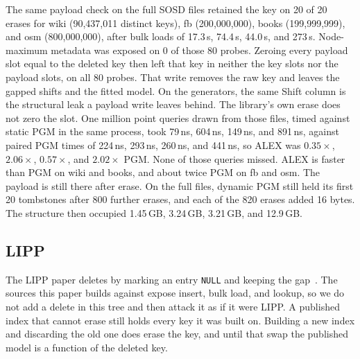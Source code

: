 \documentclass[conference]{IEEEtran}
\begin{document}
The same payload check on the full SOSD files retained the key on 20 of 20 erases for wiki (90{,}437{,}011 distinct keys), fb (200{,}000{,}000), books (199{,}999{,}999), and osm (800{,}000{,}000), after bulk loads of 17.3\,s, 74.4\,s, 44.0\,s, and 273\,s.
Node-maximum metadata was exposed on 0 of those 80 probes.
Zeroing every payload slot equal to the deleted key then left that key in neither the key slots nor the payload slots, on all 80 probes.
That write removes the raw key and leaves the gapped shifts and the fitted model.
On the generators, the same Shift column is the structural leak a payload write leaves behind.
The library's own erase does not zero the slot.
One million point queries drawn from those files, timed against static PGM in the same process, took 79\,ns, 604\,ns, 149\,ns, and 891\,ns, against paired PGM times of 224\,ns, 293\,ns, 260\,ns, and 441\,ns, so ALEX was $0.35\times$, $2.06\times$, $0.57\times$, and $2.02\times$ PGM.
None of those queries missed.
ALEX is faster than PGM on wiki and books, and about twice PGM on fb and osm.
The payload is still there after erase.
On the full files, dynamic PGM still held its first 20 tombstones after 800 further erases, and each of the 820 erases added 16 bytes.
The structure then occupied 1.45\,GB, 3.24\,GB, 3.21\,GB, and 12.9\,GB.

\subsection{LIPP}

The LIPP paper deletes by marking an entry \texttt{NULL} and keeping the gap~\cite{wu2021lipp}.
The sources this paper builds against expose insert, bulk load, and lookup, so we do not add a delete in this tree and then attack it as if it were LIPP.
A published index that cannot erase still holds every key it was built on.
Building a new index and discarding the old one does erase the key, and until that swap the published model is a function of the deleted key.
\end{document}
